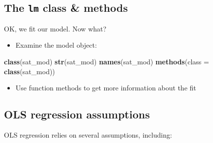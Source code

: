 \documentclass[]{book}
\newenvironment{Shaded}{\begin{snugshade}}{\end{snugshade}}
\newcommand{\KeywordTok}[1]{\textcolor[rgb]{0.13,0.29,0.53}{\textbf{#1}}}
\newcommand{\DataTypeTok}[1]{\textcolor[rgb]{0.13,0.29,0.53}{#1}}
\newcommand{\StringTok}[1]{\textcolor[rgb]{0.31,0.60,0.02}{#1}}
\newcommand{\OperatorTok}[1]{\textcolor[rgb]{0.81,0.36,0.00}{\textbf{#1}}}
\newcommand{\NormalTok}[1]{#1}
\providecommand{\tightlist}{%
  \setlength{\itemsep}{0pt}\setlength{\parskip}{0pt}}
\begin{document}
\subsection{\texorpdfstring{The \texttt{lm} class \&
methods}{The lm class \& methods}}\label{the-lm-class-methods}

OK, we fit our model. Now what?

\begin{itemize}
\tightlist
\item
  Examine the model object:
\end{itemize}

\begin{Shaded}
\begin{Highlighting}[]
  \KeywordTok{class}\NormalTok{(sat_mod)}
  \KeywordTok{str}\NormalTok{(sat_mod)}
  \KeywordTok{names}\NormalTok{(sat_mod)}
  \KeywordTok{methods}\NormalTok{(}\DataTypeTok{class =} \KeywordTok{class}\NormalTok{(sat_mod))}
\end{Highlighting}
\end{Shaded}

\begin{itemize}
\tightlist
\item
  Use function methods to get more information about the fit
\end{itemize}

\begin{Shaded}
\end{Shaded}

\subsection{OLS regression
assumptions}\label{ols-regression-assumptions}

OLS regression relies on several assumptions, including:
\end{document}
